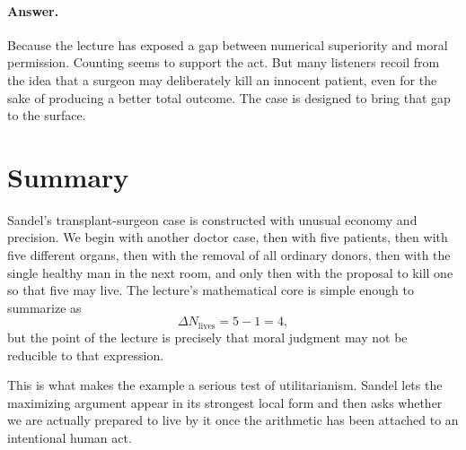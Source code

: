 \paragraph{Answer.} Because the lecture has exposed a gap between numerical superiority and moral permission. Counting seems to support the act. But many listeners recoil from the idea that a surgeon may deliberately kill an innocent patient, even for the sake of producing a better total outcome. The case is designed to bring that gap to the surface.

\section{Summary}

Sandel's transplant-surgeon case is constructed with unusual economy and precision. We begin with another doctor case, then with five patients, then with five different organs, then with the removal of all ordinary donors, then with the single healthy man in the next room, and only then with the proposal to kill one so that five may live. The lecture's mathematical core is simple enough to summarize as
\begin{equation}
\Delta N_{\text{lives}} = 5 - 1 = 4,
\end{equation}
but the point of the lecture is precisely that moral judgment may not be reducible to that expression.

This is what makes the example a serious test of utilitarianism. Sandel lets the maximizing argument appear in its strongest local form and then asks whether we are actually prepared to live by it once the arithmetic has been attached to an intentional human act.